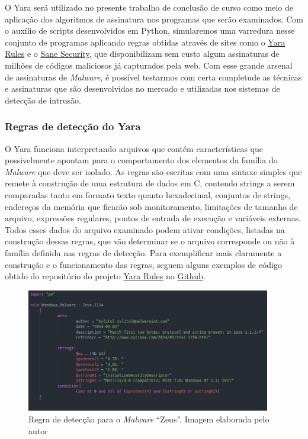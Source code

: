 O Yara será utilizado no presente trabalho de conclusão de curso como meio de
aplicação dos algoritmos de assinatura nos programas que serão examinados. Com
o auxílio de scripts desenvolvidos em Python, simularemos uma varredura nesse
conjunto de programas aplicando regras obtidas através de sites como o
\href{yararules.org}{Yara Rules} e o
\href{http://sanesecurity.com/usage/signatures/}{Sane Security}, que
disponibilizam sem custo algum assinaturas de milhões de códigos maliciosos já
capturados pela web. Com esse grande arsenal de assinaturas de \textit{Malware}, é
possível testarmos com certa completude as técnicas e assinaturas que são
desenvolvidas no mercado e utilizadas nos sistemas de detecção de intrusão.

\subsubsection{Regras de detecção do Yara} \label{l.regrasdyara} O Yara
funciona interpretando arquivos que contém características que possivelmente
apontam para o comportamento dos elementos da família do \textit{Malware} que deve ser
isolado. As regras são escritas com uma sintaxe simples que remete à
construção de uma estrutura de dados em C, contendo strings a serem comparadas
tanto em formato texto quanto hexadecimal, conjuntos de strings, endereços da
memória que ficarão sob monitoramento, limitações de tamanho de arquivo,
expressões regulares, pontos de entrada de execução e variáveis externas.
Todos esses dados do arquivo examinado podem ativar condições, listadas na
construção dessas regras, que vão determinar se o arquivo corresponde ou não à
família definida nas regras de detecção. Para exemplificar mais claramente a
construção e o funcionamento das regras, seguem alguns exemplos de código
obtido do repositório do projeto \href{yararules.org}{Yara Rules} no
\href{github.com}{Github}.

\begin{figure}[h]
	\centering
	\includegraphics[width=0.95\textwidth]{figs/zeus}
	\caption{Regra de detecção para o \textit{Malware} ``Zeus''. Imagem elaborada pelo autor}
	\label{fig:label}
\end{figure}

